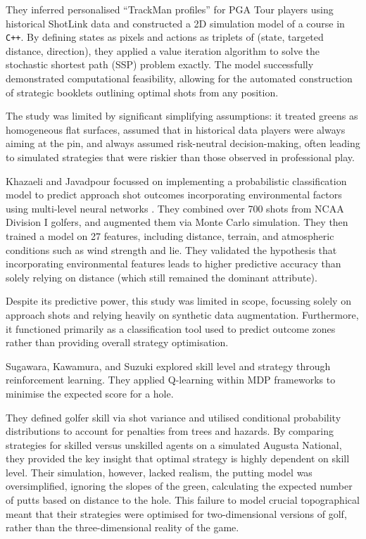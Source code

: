 \documentclass[11pt, letterpaper]{article}
\begin{document}
They inferred personalised ``TrackMan profiles'' for PGA Tour players using historical ShotLink data and constructed a 2D simulation model of a course in \texttt{C++}. By defining states as pixels and actions as triplets of (state, targeted distance, direction), they applied a value iteration algorithm to solve the stochastic shortest path (SSP) problem exactly. The model successfully demonstrated computational feasibility, allowing for the automated construction of strategic booklets outlining optimal shots from any position.

The study was limited by significant simplifying assumptions: it treated greens as homogeneous flat surfaces, assumed that in historical data players were always aiming at the pin, and always assumed risk-neutral decision-making, often leading to simulated strategies that were riskier than those observed in professional play.

Khazaeli and Javadpour focussed on implementing a probabilistic classification model to predict approach shot outcomes incorporating environmental factors using multi-level neural networks \parencite{khazaeli_golf_2024}. They combined over 700 shots from NCAA Division I golfers, and augmented them via Monte Carlo simulation. They then trained a model on 27 features, including distance, terrain, and atmospheric conditions such as wind strength and lie. They validated the hypothesis that incorporating environmental features leads to higher predictive accuracy than solely relying on distance (which still remained the dominant attribute). 

Despite its predictive power, this study was limited in scope, focussing solely on approach shots and relying heavily on synthetic data augmentation. Furthermore, it functioned primarily as a classification tool used to predict outcome zones rather than providing overall strategy optimisation.

Sugawara, Kawamura, and Suzuki explored skill level and strategy through reinforcement learning. They applied Q-learning within MDP frameworks to minimise the expected score for a hole.

They defined golfer skill via shot variance and utilised conditional probability distributions to account for penalties from trees and hazards. By comparing strategies for skilled versus unskilled agents on a simulated Augusta National, they provided the key insight that optimal strategy is highly dependent on skill level. Their simulation, however, lacked realism, the putting model was oversimplified, ignoring the slopes of the green, calculating the expected number of putts based on distance to the hole. This failure to model crucial topographical meant that their strategies were optimised for two-dimensional versions of golf, rather than the three-dimensional reality of the game.
\end{document}
